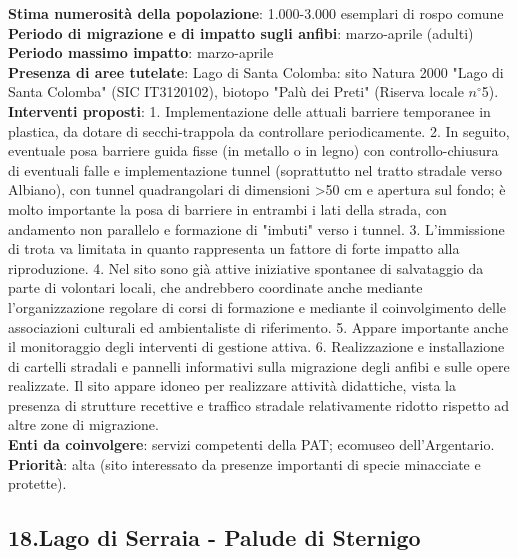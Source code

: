 \documentclass[11pt,a4paper,twoside]{memoir}
\begin{document}
\textbf{Stima numerosità della popolazione}: 1.000-3.000 esemplari di rospo comune \\
\textbf{Periodo di migrazione e di impatto sugli anfibi}: marzo-aprile (adulti) \\
\textbf{Periodo massimo impatto}: marzo-aprile \\
\textbf{Presenza di aree tutelate}: Lago di Santa Colomba: sito Natura 2000 "Lago di Santa Colomba" (SIC IT3120102), biotopo "Palù dei Preti" (Riserva locale $n^{\circ}$5). \\
\textbf{Interventi proposti}: 1. Implementazione delle attuali barriere temporanee in plastica, da dotare di secchi-trappola da controllare periodicamente. 2. In seguito, eventuale posa barriere guida fisse (in metallo o in legno) con controllo-chiusura di eventuali falle e implementazione tunnel (soprattutto nel tratto stradale verso Albiano), con tunnel quadrangolari di dimensioni >50 cm e apertura sul fondo; è molto importante la posa di barriere in entrambi i lati della strada, con andamento non parallelo e formazione di "imbuti" verso i tunnel. 3. L’immissione di trota va limitata in quanto rappresenta un fattore di forte impatto alla riproduzione. 4. Nel sito sono già attive iniziative spontanee di salvataggio da parte di volontari locali, che andrebbero coordinate anche mediante l'organizzazione regolare di corsi di formazione e mediante il coinvolgimento delle associazioni culturali ed ambientaliste di riferimento. 5. Appare importante anche il monitoraggio degli interventi di gestione attiva. 6. Realizzazione e installazione di cartelli stradali e pannelli informativi sulla migrazione degli anfibi e sulle opere realizzate. Il sito appare idoneo per realizzare attività didattiche, vista la presenza di strutture recettive e traffico stradale relativamente ridotto rispetto ad altre zone di migrazione. \\
\textbf{Enti da coinvolgere}: servizi competenti della PAT; ecomuseo dell’Argentario. \\
\textbf{Priorità}: alta (sito interessato da presenze importanti di specie minacciate e protette). \\

\newpage
\begin{tcolorbox}[breakable,colback=white,colframe=red,width=10cm]
\subsection{18.Lago di Serraia - Palude di Sternigo}
\end{tcolorbox}
\end{document}
